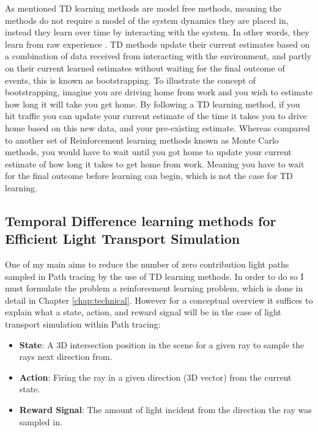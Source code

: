 \documentclass[ %
                    author={Callum Pearce},
                supervisor={Dr. Neill Campbell},
                    degree={MEng},
                     title={How effective are Temporal difference learning methods for reducing the number of zero contribution light paths while still accurately approximating Global Illumination in Path tracing?},
                  subtitle={},
                      type={research},
                      year={2019} ]{dissertation}
\begin{document}
As mentioned TD learning methods are model free methods, meaning the methods 
do not require a model of the system dynamics they are placed in, instead they
 learn over time by interacting with the system. In other words, they learn from 
 raw experience  \cite{sutton2011reinforcement}. TD methods update their current
estimates based on a combination of data received from interacting with the 
environment, and partly on their current learned estimates without waiting for the 
final outcome of events, this is known as bootstrapping. To illustrate the concept 
of bootstrapping, imagine you are driving home from work and you wish to estimate 
how long it will take you get home. By following a TD learning method, if you hit 
traffic you can update your current estimate of the time it takes you to drive home
based on this new data, and your pre-existing estimate. Whereas compared to 
another set of Reinforcement learning methods known as Monte Carlo methods, 
you would have to wait until you got home to update your current estimate of how 
long it takes to get home from work. Meaning you have to wait for the final outcome
before learning can begin, which is not the case for TD learning.

\subsection{Temporal Difference learning methods for Efficient Light Transport Simulation}

One of my main aims to reduce the number of zero contribution light paths sampled 
in Path tracing by the use of TD learning methods. In order to do so I must formulate 
the problem a reinforcement learning problem, which is done in detail in Chapter
\ref{chap:technical}. However for a conceptual overview it suffices to explain what a 
state, action, and reward signal will be in the case of light transport simulation within 
Path tracing:

\begin{itemize}

\item \textbf{State}: A 3D intersection position in the scene for a given ray to sample 
the rays next direction from. 

\item \textbf{Action}: Firing the ray in a given direction (3D vector) from the current 
state.

\item \textbf{Reward Signal}: The amount of light incident from the direction the ray 
was sampled in.

\end{itemize}
\end{document}
